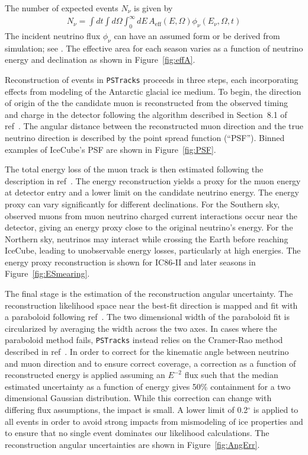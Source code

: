 \documentclass[aps,10pt,prd,twocolumn,floats,letterpaper,showpacs,nofootinbib,bibnotes,notitlepage,superscriptaddress,floatfix]{revtex4-1}
\begin{document}
The number of expected events $N_\nu$ is given by 
\begin{align}\label{eq:ev_rate}
N_\nu=\int dt \int d\Omega\int_0^\infty dE\,A_\mathrm{eff}\left(E, \Omega\right) \phi_\nu\left(E_\nu,\Omega, t\right)
\end{align}
The incident neutrino flux $\phi_\nu$ can have an assumed form or be derived from simulation; see \cite{Aartsen:2016xlq}. The effective area for each season varies as a function of neutrino energy and declination as shown in Figure~\ref{fig:effA}.

Reconstruction of events in {\tt PSTracks} proceeds in three steps, each incorporating effects from modeling of the Antarctic glacial ice medium. To begin, the direction of origin of the the candidate muon is reconstructed from the observed timing and charge in the detector following the algorithm described in Section~8.1 of ref~\cite{Ahrens:2004direc}. The angular distance between the reconstructed muon direction and the true neutrino direction is described by the point spread function (``PSF''). Binned examples of IceCube's PSF are shown in Figure~\ref{fig:PSF}.

The total energy loss of the muon track is then estimated following the description in ref~\cite{Aartsen:2014erec}. The energy reconstruction yields a proxy for the muon energy at detector entry and a lower limit on the candidate neutrino energy. The energy proxy can vary significantly for different declinations. For the Southern sky, observed muons from muon neutrino charged current interactions occur near the detector, giving an energy proxy close to the original neutrino's energy. For the Northern sky, neutrinos may interact while crossing the Earth before reaching IceCube, leading to unobservable energy losses, particularly at high energies. The energy proxy reconstruction is shown for IC86-II and later seasons in Figure~\ref{fig:ESmearing}.

The final stage is the estimation of the reconstruction angular uncertainty. The reconstruction likelihood space near the best-fit direction is mapped and fit with a paraboloid following ref~\cite{Neunhoeffer:2006}. The two dimensional width of the paraboloid fit is circularized by averaging the width across the two axes. In cases where the paraboloid method fails, {\tt PSTracks} instead relies on the Cramer-Rao method described in ref~\cite{Lunemann:2013oya}. In order to correct for the kinematic angle between neutrino and muon direction and to ensure correct coverage, a correction as a function of reconstructed energy is applied assuming an $E^{-2}$ flux such that the median estimated uncertainty as a function of energy gives 50\% containment for a two dimensional Gaussian distribution. While this correction can change with differing flux assumptions, the impact is small. A lower limit of 0.2$^\circ$ is applied to all events in order to avoid strong impacts from mismodeling of ice properties and to ensure that no single event dominates our likelihood calculations. The reconstruction angular uncertainties are shown in Figure~\ref{fig:AngErr}.
\end{document}
